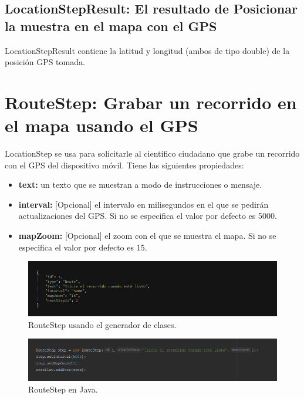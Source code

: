\subsection{LocationStepResult: El resultado de Posicionar la muestra en el mapa con el GPS}
LocationStepResult contiene la latitud y longitud (ambos de tipo double) de la posición GPS tomada.





\section{RouteStep: Grabar un recorrido en el mapa usando el GPS}
LocationStep se usa para solicitarle al científico ciudadano que grabe un recorrido con el GPS del dispositivo móvil. Tiene las siguientes propiedades:

\begin{itemize}
\item \textbf{text:} un texto que se muestran a modo de instrucciones o mensaje.
\item \textbf{interval:} [Opcional] el intervalo en milisegundos en el que se pedirán actualizaciones del GPS. Si no se especifica el valor por defecto es 5000.
\item \textbf{mapZoom:} [Opcional] el zoom con el que se muestra el mapa. Si no se especifica el valor por defecto es 15.
\end{itemize}


\begin{figure}[H]
  \centering
    \includegraphics[scale=0.6]{50-anexos/C-steps/route_json.png} 
    \caption{RouteStep usando el generador de clases.}
\end{figure}	

\begin{figure}[H]
  \centering
    \includegraphics[scale=0.6]{50-anexos/C-steps/route_java.png} 
    \caption{RouteStep en Java.}
\end{figure}

